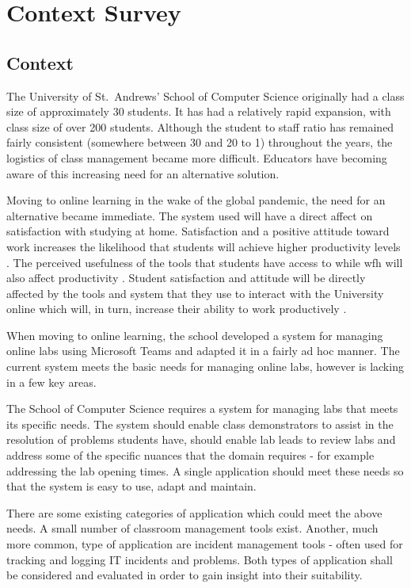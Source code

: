 \chapter{Context Survey}
\section{Context}

The University of St.\ Andrews' School of Computer Science originally had a class size of approximately 30 students. It has had a relatively rapid expansion, with class size of over 200 students. Although the student to staff ratio has remained fairly consistent (somewhere between 30 and 20 to 1) throughout the years, the logistics of class management became more difficult. Educators have becoming aware of this increasing need for an alternative solution.

Moving to online learning in the wake of the global pandemic, the need for an alternative became immediate. The system used will have a direct affect on satisfaction with studying at home. Satisfaction and a positive attitude toward work increases the likelihood that students will achieve higher productivity levels \cite{tenney}. The perceived usefulness of the tools that students have access to while \gls{wfh} will also affect productivity \cite{venka}. Student satisfaction and attitude will be directly affected by the tools and system that they use to interact with the University online which will, in turn, increase their ability to work productively \cite{safaa}.

When moving to online learning, the school developed a system for managing online labs using Microsoft Teams \cite{teams} and adapted it in a fairly ad hoc manner. The current system meets the basic needs for managing online labs, however is lacking in a few key areas.

The School of Computer Science requires a system for managing labs that meets its specific needs. The system should enable class demonstrators to assist in the resolution of problems students have, should enable lab leads to review labs and address some of the specific nuances that the domain requires - for example addressing the lab opening times. A single application should meet these needs so that the system is easy to use, adapt and maintain.

There are some existing categories of application which could meet the above needs. A small number of classroom management tools exist. Another, much more common, type of application are incident management tools - often used for tracking and logging IT incidents and problems. Both types of application shall be considered and evaluated in order to gain insight into their suitability.
 
